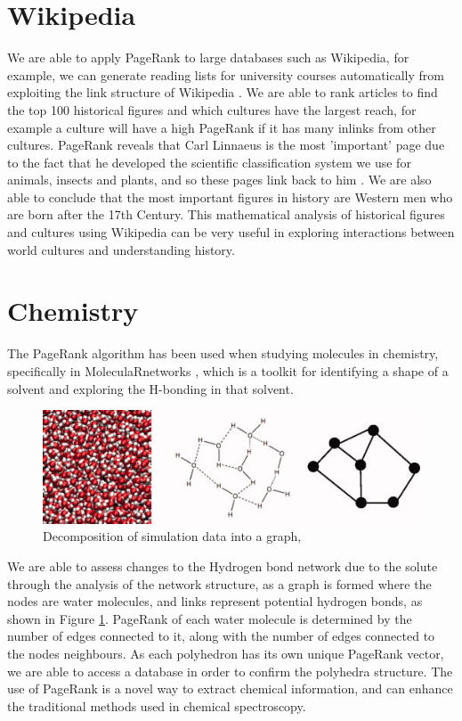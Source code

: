 \documentclass[11pt]{report}
\begin{document}
\section{Wikipedia}
We are able to apply PageRank to large databases such as Wikipedia, for example, we can generate reading lists for university courses automatically from exploiting the link structure of Wikipedia \cite{wissner2006preparation}. We are able to rank articles to find the top 100 historical figures and which cultures have the largest reach, for example a culture will have a high PageRank if it has many inlinks from other cultures. PageRank reveals that Carl Linnaeus is the most 'important' page due to the fact that he developed the scientific classification system we use for animals, insects and plants, and so these pages link back to him \cite{eom2015interactions}. We are also able to conclude that the most important figures in history are Western men who are born after the 17th Century. This mathematical analysis of historical figures and cultures using Wikipedia can be very useful in exploring interactions between world cultures and understanding history.


\section{Chemistry}
The PageRank algorithm has been used when studying molecules in chemistry, specifically in MoleculaRnetworks \cite{JCC:JCC22917}, which is a toolkit for identifying a shape of a solvent and exploring the H-bonding in that solvent. 
\begin{figure}
\includegraphics[width=\linewidth]{Decomposition_of_simulation_date_into_a_graph_-chem.jpg}
\caption{Decomposition of simulation data into a graph, \cite{JCC:JCC22917}}
\label{fig:chem}
\end{figure}
We are able to assess changes to the Hydrogen bond network due to the solute through the analysis of the network structure, as a graph is formed where the nodes are water molecules, and links represent potential hydrogen bonds, as shown in Figure \ref{fig:chem}. PageRank of each water molecule is determined by the number of edges connected to it, along with the number of edges connected to the nodes neighbours. As each polyhedron has its own unique PageRank vector, we are able to access a database in order to confirm the polyhedra structure. The use of PageRank is a novel way to extract chemical information, and can enhance the traditional methods used in chemical spectroscopy.
\end{document}
